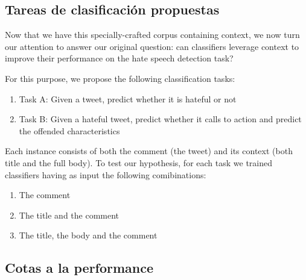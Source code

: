 \subsection{Tareas de clasificación propuestas}

Now that we have this specially-crafted corpus containing context, we now turn our attention to answer our original question: can classifiers leverage context to improve their performance on the hate speech detection task?

For this purpose, we propose the following classification tasks:

\begin{enumerate}
    \item Task A: Given a tweet, predict whether it is hateful or not
    \item Task B: Given a hateful tweet, predict whether it calls to action and predict the offended characteristics
\end{enumerate}

Each instance consists of both the comment (the tweet) and its context (both title and the full body). To test our hypothesis, for each task we trained classifiers having as input the following comibinations:

\begin{enumerate}
    \item The comment
    \item The title and the comment
    \item The title, the body and the comment
\end{enumerate}


\subsection{Cotas a la performance}

